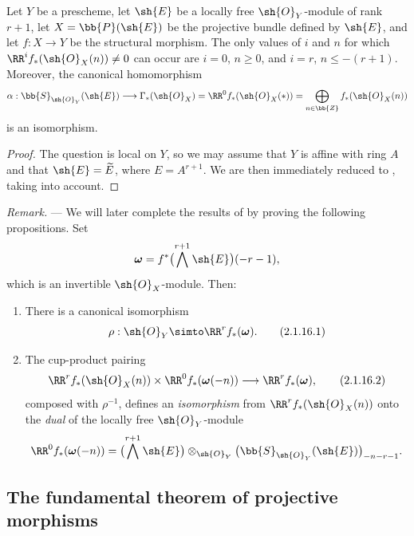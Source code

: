 \begin{proposition}[2.1.15]
\label{III.2.1.15}
Let $Y$ be a prescheme, let $\sh{E}$ be a locally free $\sh{O}_Y$-module of rank $r+1$, let $X=\bb{P}(\sh{E})$ be the projective bundle defined by $\sh{E}$, and let $f:X\to Y$ be the structural morphism.
The only values of $i$ and $n$ for which $\RR^if_*(\sh{O}_X(n))\neq0$ can occur are $i=0$, $n\geq0$, and $i=r$, $n\leq-(r+1)$.
Moreover, the canonical homomorphism 
\[
  \alpha:\bb{S}_{\sh{O}_Y}(\sh{E})
  \longrightarrow \Gamma_*(\sh{O}_X)
  =\RR^0f_*(\sh{O}_X(*))
  =\bigoplus_{n\in\bb{Z}}f_*(\sh{O}_X(n))
\]
is an isomorphism.
\end{proposition}

\begin{proof}
The question is local on $Y$, so we may assume that $Y$ is affine with ring $A$ and that $\sh{E}=\widetilde{E}$, where $E=A^{r+1}$.
We are then immediately reduced to , taking  into account.
\end{proof}

\begin{env}[2.1.16]
\label{III.2.1.16}
\emph{Remark.} ---
We will later complete the results of  by proving the following propositions.
Set
\[
  \boldsymbol{\omega}=f^*\bigl(\bigwedge^{r+1}\sh{E}\bigr)(-r-1),
\]
which is an invertible $\sh{O}_X$-module.
Then:
\begin{enumerate}
  \item[{\rm(i)}] There is a canonical isomorphism
  \[
  \label{III.2.1.16.1}
    \rho:\sh{O}_Y \simto \RR^rf_*(\boldsymbol{\omega}).
    \tag{2.1.16.1}
  \]
  \item[{\rm(ii)}] The cup-product pairing 
  \[
  \label{III.2.1.16.2}
    \RR^rf_*(\sh{O}_X(n))
    \times \RR^0f_*(\boldsymbol{\omega}(-n))
    \longrightarrow \RR^rf_*(\boldsymbol{\omega}),
    \tag{2.1.16.2}
  \]
  composed with $\rho^{-1}$, defines an \emph{isomorphism} from $\RR^rf_*(\sh{O}_X(n))$ onto the \emph{dual} of the locally free $\sh{O}_Y$-module
  \[
    \RR^0f_*(\boldsymbol{\omega}(-n))
    =\bigl(\bigwedge^{r+1}\sh{E}\bigr)
      \otimes_{\sh{O}_Y}
      \bigl(\bb{S}_{\sh{O}_Y}(\sh{E})\bigr)_{-n-r-1}.
  \]
\end{enumerate}
\end{env}

\subsection{The fundamental theorem of projective morphisms}
\label{subsection:III.2.2}

